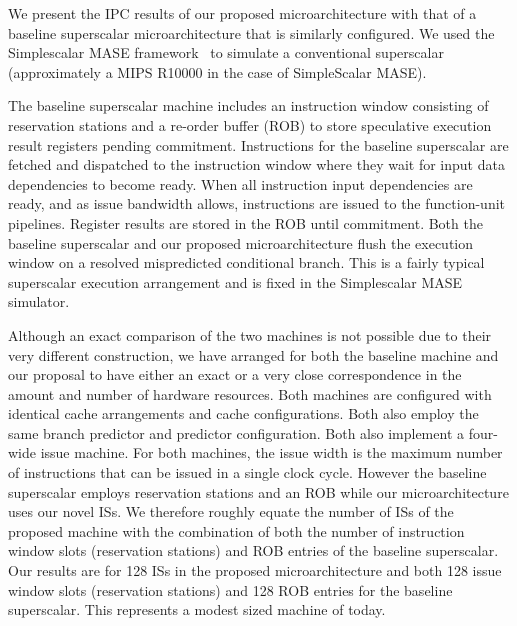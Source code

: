 \documentclass[10pt,dvips]{article}
\begin{document}
We present the IPC results of our proposed
microarchitecture with that of a baseline 
superscalar microarchitecture that is similarly configured.
We used the 
Simplescalar MASE framework~\cite{Austin97}
to simulate a conventional superscalar (approximately a MIPS R10000
in the case of SimpleScalar MASE).

The baseline superscalar machine includes an instruction
window consisting of reservation stations and a re-order buffer (ROB)
to store speculative execution result registers pending commitment.
Instructions for the baseline superscalar are fetched and dispatched
to the instruction window where they wait for input data dependencies to
become ready.  When all instruction input dependencies are ready,
and as issue bandwidth allows, instructions are issued to the
function-unit pipelines.  Register results are stored in the ROB
until commitment.  
Both the baseline superscalar and our proposed
microarchitecture flush the execution window on a resolved mispredicted 
conditional branch.
This is a fairly typical superscalar execution
arrangement and is fixed in the Simplescalar MASE simulator.

Although an exact comparison of the two machines is not possible
due to their very different construction, we have arranged
for both the baseline machine and our proposal to have either an
exact or a very
close correspondence in the amount and number of hardware resources.
Both machines are configured with identical
cache arrangements and cache configurations.
Both also employ the same branch predictor and predictor configuration.
Both also implement a four-wide issue machine.
For both machines, the issue width is the maximum number of
instructions that can be issued in a single clock cycle.
However the baseline superscalar employs reservation stations and
an ROB while our microarchitecture uses our novel ISs.
We therefore roughly equate the number of ISs of
the proposed machine with the combination of both the
number of instruction window slots (reservation stations)
and ROB entries of the baseline superscalar.
Our results are for 128 ISs in the proposed 
microarchitecture and both 128 issue window slots (reservation stations)
and 128 ROB entries for the baseline superscalar.
This represents a modest sized machine of today.
\end{document}
